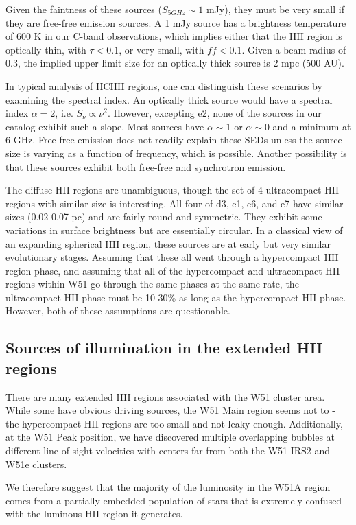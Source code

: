 Given the faintness of these sources ($S_{5 GHz} \sim 1$ mJy), they must be
very small if they are free-free emission sources.  A 1 mJy source has a
brightness temperature of 600 K in our C-band observations, which implies
either that the HII region is optically thin, with $\tau < 0.1$, or very small,
with $ff<0.1$.  Given a beam radius of 0.3\arcsec, the implied upper limit size
for an optically thick source is 2 mpc (500 AU).

In typical analysis of HCHII regions, one can distinguish these scenarios by
examining the spectral index.  An optically thick source would have a spectral
index $\alpha=2$, i.e. $S_\nu \propto \nu^2$.  However, excepting e2, none of
the sources in our catalog exhibit such a slope.  Most sources have
$\alpha\sim1$ or $\alpha\sim0$ and a minimum at 6 GHz.  Free-free emission does
not readily explain these SEDs unless the source size is varying as a function
of frequency, which is possible.  Another possibility is that these sources
exhibit both free-free and synchrotron emission.

The diffuse HII regions are unambiguous, though the set of 4 ultracompact HII
regions with similar size is interesting.  All four of d3, e1, e6, and e7 have
similar sizes (0.02-0.07 pc) and are fairly round and symmetric.  They exhibit
some variations in surface brightness but are essentially circular.  In a
classical view of an expanding spherical HII region, these sources are at early
but very similar evolutionary stages.  Assuming that these all went through a
hypercompact HII region phase, and assuming that all of the hypercompact and
ultracompact HII regions within W51 go through the same phases at the same
rate, the ultracompact HII phase must be 10-30\% as long as the hypercompact
HII phase.  However, both of these assumptions are questionable.


\subsection{Sources of illumination in the extended HII regions}
There are many extended HII regions associated with the W51 cluster area.
While some have obvious driving sources, the W51 Main region seems not to - the
hypercompact HII regions are too small and not leaky enough.  Additionally, at
the W51 Peak position, we have discovered multiple overlapping bubbles at
different line-of-sight velocities with centers far from both the W51 IRS2 and
W51e clusters.

We therefore suggest that the majority of the luminosity in the W51A
region comes from a partially-embedded population of stars that is
extremely confused with the luminous HII region it generates.

